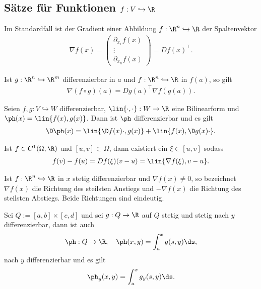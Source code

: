 \subsection{Sätze für Funktionen $f: V\hookrightarrow\R$}
\begin{prop}
Im Standardfall ist der Gradient einer Abbildung $f: \R^n\hookrightarrow\R$
der Spaltenvektor
\begin{align*}
\nabla f(x) = \begin{pmatrix} \partial_{x_1} f(x) \\ \vdots \\ \partial_{x_n}
f(x)
\end{pmatrix} = Df(x)^\top.
\end{align*}
\end{prop}
\begin{prop}[Kettenregel]
Ist $g: \R^n\hookrightarrow\R^m$ differenzierbar in $a$ und $f:
\R^n\hookrightarrow\R$ in $f(a)$, so gilt
\begin{align*}
\nabla (f\circ g)(a) = Dg(a)^\top\nabla f(g(a)).
\end{align*}
\end{prop}
\begin{prop}[Produktregel]
Seien $f,g: V\hookrightarrow W$ differenzierbar, $\lin{\cdot,\cdot}: W\to
\R$ eine Bilinearform und $\ph(x) = \lin{f(x),g(x)}$. Dann ist $\ph$
differenzierbar und es gilt
\begin{align*}
\D\ph(x) = \lin{\D f(x)\cdot, g(x)} + \lin{f(x), \D g(x)\cdot}. 
\end{align*}
\end{prop}
\begin{prop}[Mittelwertsatz]
Ist $f \in C^1(\Omega,\R)$ und $[u,v]\subset\Omega$, dann existiert ein
$\xi\in[u,v]$ sodass
\begin{align*}
f(v)-f(u) = Df(\xi)(v-u) = \lin{\nabla f(\xi),v-u}.
\end{align*}
\end{prop}
\begin{prop}
Ist $f: \R^n\hookrightarrow\R$ in $x$ stetig differenzierbar und $\nabla
f(x)\neq 0$, so bezeichnet $\nabla f(x)$ die Richtung des steilsten Anstiegs
und $-\nabla f(x)$ die Richtung des steilsten Abstiegs. Beide Richtungen sind
eindeutig.
\end{prop}
\begin{prop}
Sei $Q := [a,b]\times[c,d]$ und sei $g: Q\to\R$ auf $Q$ stetig und stetig nach
$y$ differenzierbar, dann ist auch
\begin{align*}
\ph: Q\to\R,\quad\ph(x,y) = \int_a^x g(s,y)\ds,
\end{align*}
nach $y$ differenzierbar und es gilt
\begin{align*}
\ph_y(x,y) = \int_a^x g_y(s,y)\ds.
\end{align*}
\end{prop}

